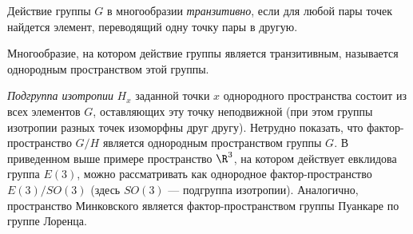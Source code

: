 \documentclass[a4paper
]{article}
\begin{document}
Действие группы $G$ в многообразии {\em транзитивно}, если для
любой пары точек найдется элемент, переводящий одну точку пары в
другую.\begin{Def}Многообразие, на котором действие группы
является транзитивным, называется однородным пространством этой
группы.\end{Def} {\em Подгруппа изотропии} $H_x$ заданной точки
$x$ однородного пространства состоит из всех элементов $G$,
оставляющих эту точку неподвижной (при этом группы изотропии
разных точек изоморфны друг другу). Нетрудно показать, что
фактор-пространство $G/H$ является однородным пространством группы
$G$. В приведенном выше примере пространство $\R^3$, на котором
действует евклидова группа $E(3)$, можно рассматривать как
однородное фактор-пространство $E(3)/SO(3)$ (здесь $SO(3)$ ---
подгруппа изотропии). Аналогично, пространство Минковского
является фактор-пространством группы Пуанкаре по группе Лоренца.
\par
\end{document}
